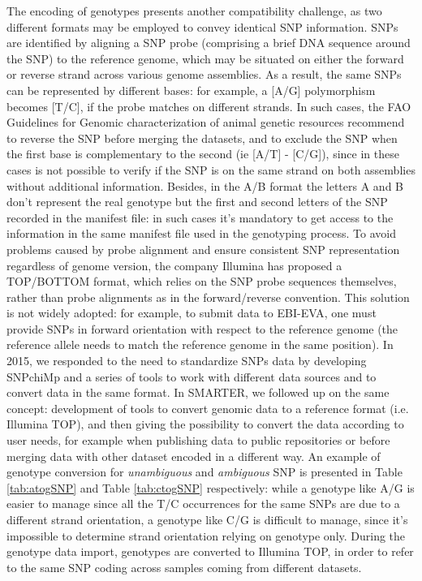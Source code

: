 \documentclass[a4paper,num-refs,gigabyte]{oup-contemporary}
\begin{document}
The encoding of genotypes presents another compatibility challenge, as two different formats may be employed to convey identical SNP information. SNPs are identified by aligning a SNP probe (comprising a brief DNA sequence around the SNP) to the reference genome, which may be situated on either the forward or reverse strand across various genome assemblies. As a result, the same SNPs can be represented by different bases: for example, a [A/G] polymorphism becomes [T/C], if the probe matches on different strands. In such cases, the FAO Guidelines for Genomic characterization of animal genetic resources\citep{Ajmone23} recommend to reverse the SNP before merging the datasets, and to exclude the SNP when the first base is complementary to the second (ie [A/T] - [C/G]), since in these cases is not possible to verify if the SNP is on the same strand on both assemblies without additional information.
Besides, in the A/B format the letters A and B don’t represent the real genotype but the first and second letters of the SNP recorded in the manifest file: in such cases it’s mandatory to get access to the information in the same manifest file used in the genotyping process.
To avoid problems caused by probe alignment and ensure consistent SNP representation regardless of genome version, the company Illumina has proposed a TOP/BOTTOM format\citep{IlluminaTOP}, which relies on the SNP probe sequences themselves, rather than probe alignments as in the forward/reverse convention. This solution is not widely adopted: for example, to submit data to EBI-EVA\citep{EVASubmit}, one must provide SNPs in forward orientation with respect to the reference genome (the reference allele needs to match the reference genome in the same position\citep{AssemblyChecker}).
In 2015, we responded to the need to standardize SNPs data\citep{Nicolazzi2015a} by developing SNPchiMp\citep{Nicolazzi2015b} and a series of tools to work with different data sources and to convert data in the same format\citep{Nicolazzi2016}. In SMARTER, we followed up on the same concept: development of tools to convert genomic data to a reference format (i.e. Illumina TOP), and then giving the possibility to convert the data according to user needs, for example when publishing data to public repositories or before merging data with other dataset encoded in a different way. An example of genotype conversion for \emph{unambiguous} and \emph{ambiguous} SNP is presented in Table \ref{tab:atogSNP} and Table \ref{tab:ctogSNP} respectively: while a genotype like A/G is easier to manage since all the T/C occurrences for the same SNPs are due to a different strand orientation, a genotype like C/G is difficult to manage, since it’s impossible to determine strand orientation relying on genotype only. During the genotype data import, genotypes are converted to Illumina TOP, in order to refer to the same SNP coding across samples coming from different datasets.
\end{document}

